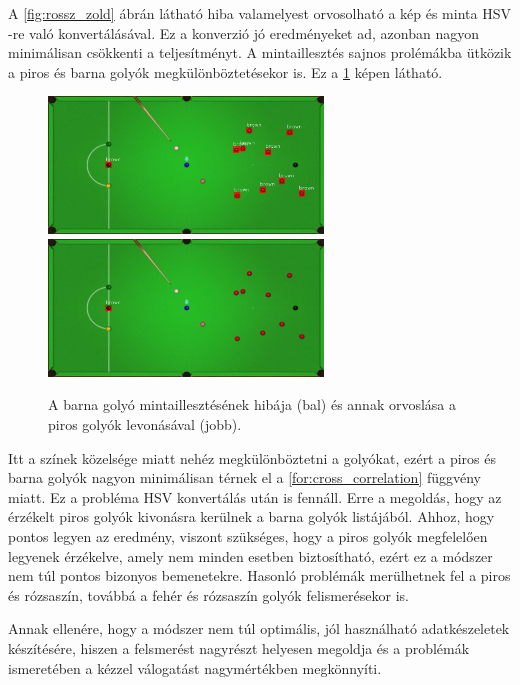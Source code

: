 \par A \ref{fig:rossz_zold} ábrán látható hiba valamelyest orvosolható a kép és minta HSV -re való konvertálásával. Ez a konverzió jó eredményeket ad, azonban nagyon minimálisan csökkenti a teljesítményt. A mintaillesztés sajnos prolémákba ütközik a piros és barna golyók megkülönböztetésekor is. Ez a \ref{fig:rossz_barna} képen látható.

\begin{figure}[!ht]
    \centering
    \includegraphics[width=73mm, keepaspectratio]{figures/wrong_brown.png}\hspace{2mm}
	\includegraphics[width=73mm, keepaspectratio]{figures/brown_ok.png}\\\vspace{5mm}
    \caption{A barna golyó mintaillesztésének hibája (bal) és annak orvoslása a piros golyók levonásával (jobb).}
    \label{fig:rossz_barna}
\end{figure}

\par Itt a színek közelsége miatt nehéz megkülönböztetni a golyókat, ezért a piros és barna golyók nagyon minimálisan térnek el a \ref{for:cross_correlation} függvény miatt. Ez a probléma HSV konvertálás után is fennáll. Erre a megoldás, hogy az érzékelt piros golyók kivonásra kerülnek a barna golyók listájából. Ahhoz, hogy pontos legyen az eredmény, viszont szükséges, hogy a piros golyók megfelelően legyenek érzékelve, amely nem minden esetben biztosítható, ezért ez a módszer nem túl pontos bizonyos bemenetekre. Hasonló problémák merülhetnek fel a piros és rózsaszín, továbbá a fehér és rózsaszín golyók felismerésekor is.
\par Annak ellenére, hogy a módszer nem túl optimális, jól használható adatkészeletek készítésére, hiszen a felsmerést nagyrészt helyesen megoldja és a problémák ismeretében a kézzel válogatást nagymértékben megkönnyíti.


